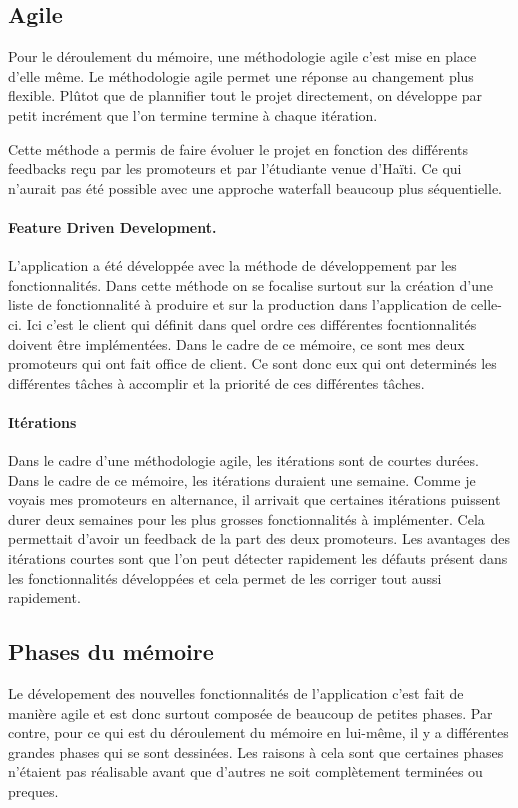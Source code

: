 \documentclass{EPL-master-thesis-covers-FR}
\begin{document}
			\subsection*{Agile}
				Pour le déroulement du mémoire, une méthodologie agile c'est mise en place d'elle même.
				Le méthodologie agile permet une réponse au changement plus flexible. Plûtot que de plannifier tout le projet directement, on développe par petit incrément que l'on termine termine à chaque itération. 
				
				Cette méthode a permis de faire évoluer le projet en fonction des différents feedbacks reçu par les promoteurs et par l'étudiante venue d'Haïti. Ce qui n'aurait pas été possible avec une approche waterfall beaucoup plus séquentielle.
				
			
				\paragraph*{Feature Driven Development.} L'application a été développée avec la méthode de développement par les fonctionnalités. Dans cette méthode on se focalise surtout sur la création d'une liste de fonctionnalité à produire et sur la production dans l'application de celle-ci. Ici c'est le client qui définit dans quel ordre ces différentes focntionnalités doivent être implémentées. Dans le cadre de ce mémoire, ce sont mes deux promoteurs qui ont fait office de client. Ce sont donc eux qui ont determinés les différentes tâches à accomplir et la priorité de ces différentes tâches. 
				
				\paragraph*{Itérations} Dans le cadre d'une méthodologie agile, les itérations sont de courtes durées. Dans le cadre de ce mémoire, les itérations duraient une semaine. Comme je voyais mes promoteurs en alternance, il arrivait que certaines itérations puissent durer deux semaines pour les plus grosses fonctionnalités à implémenter. Cela permettait d'avoir un feedback de la part des deux promoteurs.
				Les avantages des itérations courtes sont que l'on peut détecter rapidement les défauts présent dans les fonctionnalités développées et cela permet de les corriger tout aussi rapidement. 

				

			\subsection*{Phases du mémoire}
				Le dévelopement des nouvelles fonctionnalités de l'application c'est fait de manière agile et est donc surtout composée de beaucoup de petites phases. Par contre, pour ce qui est du déroulement du mémoire en lui-même, il y a différentes grandes phases qui se sont dessinées.
			Les raisons à cela sont que certaines phases n'étaient pas réalisable avant que d'autres ne soit complètement terminées ou preques. 
				
\end{document}
